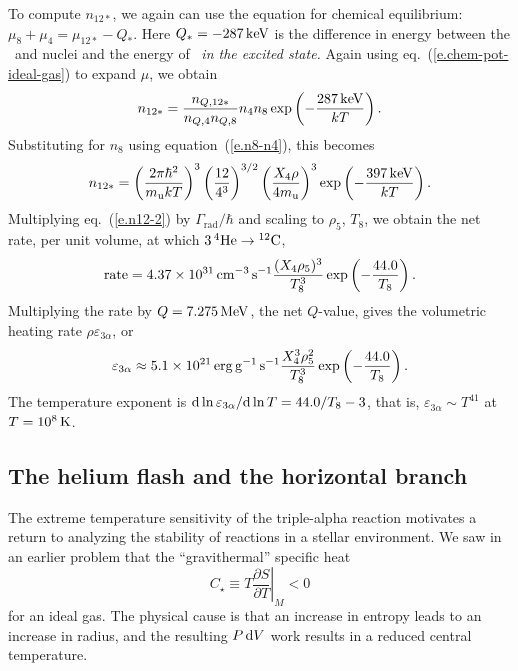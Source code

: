To compute $n_{12*}$, we again can use the equation for chemical equilibrium: $\mu_{8} + \mu_{4} = \mu_{12*} - Q_{*}$.  Here $Q_{*} = -287\,\mathrm{k}\mathrm{eV}$ is the difference in energy between the \helium\ and \beryllium[8] nuclei and the energy of \carbon\ \emph{in the excited state.}  Again using eq.~(\ref{e.chem-pot-ideal-gas}) to expand $\mu$, we obtain
\begin{equation}\label{e.n12}
n_{12*} = \frac{n_{Q,12*}}{n_{Q,4}n_{Q,8}} n_{4}n_{8}\exp\left(-\frac{287\,\mathrm{k}\mathrm{eV}}{kT}\right).
\end{equation}
Substituting for $n_{8}$ using equation~(\ref{e.n8-n4}), this becomes
\begin{equation}\label{e.n12-2}
n_{12*} = \left(\frac{2\pi\hbar^{2}}{m_\mathrm{u} kT}\right)^{3}\left(\frac{12}{4^{3}}\right)^{3/2} 
	\left(\frac{X_{4}\rho}{4m_\mathrm{u}}\right)^{3} \exp\left(-\frac{397\,\mathrm{k}\mathrm{eV}}{kT}\right).
\end{equation}
Multiplying eq.~(\ref{e.n12-2}) by $\Gamma_{\mathrm{rad}}/\hbar$ and scaling to $\rho_{5}$, $T_{8}$, we obtain the net rate, per unit volume, at which $3\,\mathrm{^{4}He}\to\mathrm{^{12}C}$,
\begin{equation}\label{e.triple-alpha}
 \textrm{rate} = 4.37\times 10^{31}\,\mathrm{c}\mathrm{m}^{-3}\,\mathrm{s}^{-1}\frac{(X_{4}\rho_{5})^{3}}{T_{8}^{3}}\exp\left(-\frac{44.0}{T_{8}}\right).
\end{equation}
Multiplying the rate by $Q = 7.275\,\mathrm{M}\mathrm{eV}$, the net $Q$-value, gives the volumetric heating rate $\rho\varepsilon_{3\alpha}$, or
\begin{equation}\label{e.triple-alpha-heating}
\varepsilon_{3\alpha} \approx 5.1\times 10^{21}\,\mathrm{erg}\,\mathrm{g}^{-1}\,\mathrm{s}^{-1}\frac{X_{4}^{3}\rho_{5}^{2}}{T_{8}
^{3}}\exp\left(-\frac{44.0}{T_{8}}\right).
\end{equation}
The temperature exponent is $\mathrm{d}\ln\varepsilon_{3\alpha}/\mathrm{d}\ln T = 44.0/T_{8}-3$, that is, $\varepsilon_{3\alpha}\sim T^{41}$ at $T = 10^{8}\,\mathrm{K}$.

\subsection[Core helium burning]{The helium flash and the horizontal branch}\label{s.burning-stability}

The extreme temperature sensitivity of the triple-alpha reaction motivates a return to analyzing the stability of reactions in a stellar environment. We saw in an earlier problem that the ``gravithermal'' specific heat 
\[ C_{\star} \equiv T\left.\frac{\partial S}{\partial T}\right|_{M} < 0 \]
for an ideal gas. The physical cause is that an increase in entropy leads to an increase in radius, and the resulting $P\,\mathrm{d} V$ work results in a reduced central temperature.

